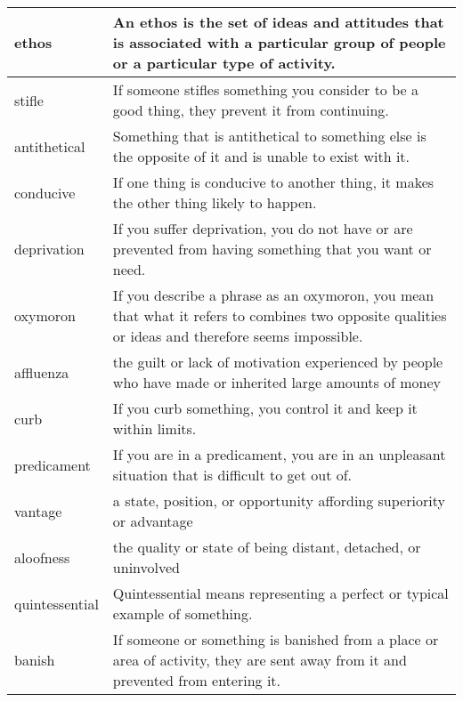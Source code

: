 \documentclass{article}
\begin{document}
\begin{center}
\begin{longtable}{|l|p{7cm}|}
\hline
ethos
&
An ethos is the set of ideas and attitudes that is associated with a particular group of people or a particular type of activity.
\\

\hline
stifle
&
If someone stifles something you consider to be a good thing, they prevent it from continuing.
\\

\hline
antithetical
&
Something that is antithetical to something else is the opposite of it and is unable to exist with it.
\\

\hline
conducive
&
If one thing is conducive to another thing, it makes the other thing likely to happen.
\\

\hline
deprivation
&
If you suffer deprivation, you do not have or are prevented from having something that you want or need.
\\

\hline
oxymoron
&
If you describe a phrase as an oxymoron, you mean that what it refers to combines two opposite qualities or ideas and therefore seems impossible.
\\

\hline
affluenza
&
the guilt or lack of motivation experienced by people who have made or inherited large amounts of money
\\

\hline
curb
&
If you curb something, you control it and keep it within limits.
\\

\hline
predicament
&
If you are in a predicament, you are in an unpleasant situation that is difficult to get out of.
\\

\hline
vantage
&
a state, position, or opportunity affording superiority or advantage
\\

\hline
aloofness
&
the quality or state of being distant, detached, or uninvolved
\\

\hline
quintessential
&
Quintessential means representing a perfect or typical example of something.
\\

\hline
banish
&
If someone or something is banished from a place or area of activity, they are sent away from it and prevented from entering it.
\\


\end{longtable}
\end{center}
\end{document}
